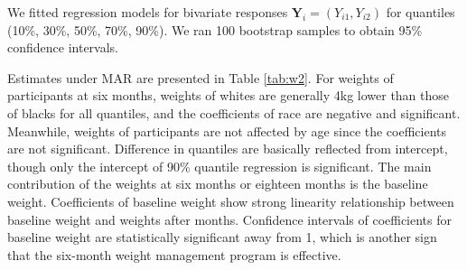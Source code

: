 \documentclass[12pt]{article}
\begin{document}
We fitted regression models for bivariate responses $\bm Y_i =
(Y_{i1}, Y_{i2})$ for quantiles (10\%, 30\%, 50\%, 70\%, 90\%).  We
ran 100 bootstrap samples to obtain 95\% confidence intervals.

Estimates under MAR are presented in Table \ref{tab:w2}. For weights
of participants at six months, weights of whites are generally 4kg
lower than those of blacks for all quantiles, and the coefficients of
race are negative and significant. Meanwhile, weights of participants
are not affected by age since the coefficients are not
significant. Difference in quantiles are basically reflected from
intercept, though only the intercept of 90\% quantile regression is
significant. The main contribution of the weights at six months or
eighteen months is the baseline weight. Coefficients of baseline
weight show strong linearity relationship between baseline weight and
weights after months. Confidence intervals of coefficients for
baseline weight are statistically significant away from 1, which is
another sign that the six-month weight management program is
effective.
\end{document}

